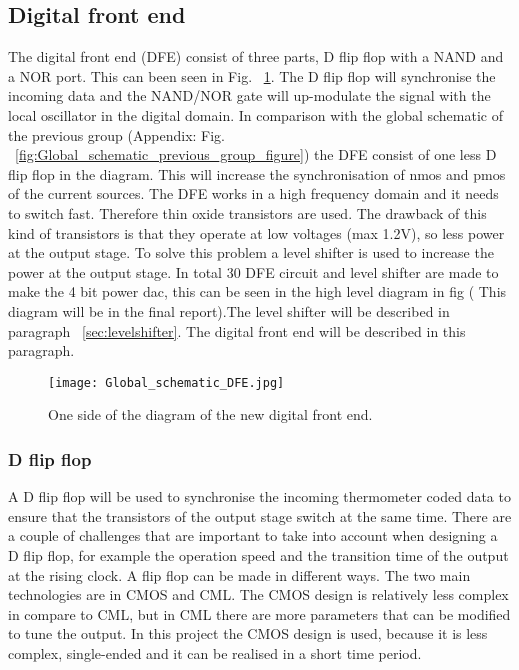 \subsection{Digital front end}\label{sec:frontend}
The digital front end (DFE) consist of three parts, D flip flop with a NAND and a NOR port. This can been seen in Fig. ~\ref{fig:Global_schematic_DFE_figure}. The D flip flop will synchronise the incoming data and the NAND/NOR gate will up-modulate the signal with the local oscillator in the digital domain. In comparison with the global schematic of the previous group (Appendix: Fig. ~\ref{fig:Global_schematic_previous_group_figure}) the DFE consist of one less D flip flop in the diagram. This will increase the synchronisation of nmos and pmos of the current sources. The DFE works in a high frequency domain and it needs to switch fast. Therefore thin oxide transistors are used. The drawback of this kind of transistors is that they operate at low voltages (max 1.2V), so less power at the output stage. To solve this problem a level shifter is used to increase the power at the output stage. In total 30 DFE circuit and level shifter are made to make the 4 bit power dac, this can be seen in the high level diagram in fig ( This diagram will be in the final report).The level shifter will be described in paragraph ~\ref{sec:levelshifter}. The digital front end will be described in this paragraph.

\begin{figure}[h]
\texttt{[image: Global\_schematic\_DFE.jpg]}
\caption{One side of the diagram of the new digital front end.}
\label{fig:Global_schematic_DFE_figure}
\end{figure}

\subsubsection{D flip flop}\label{sec:frontend}
A D flip flop will be used to synchronise the incoming thermometer coded data to ensure that the transistors of the output stage switch at the same time. There are a couple of challenges that are important to take into account when designing a D flip flop, for example the operation speed and the transition time of the output at the rising clock.
A flip flop can be made in different ways. The two main technologies are in CMOS and CML. The CMOS design is relatively less complex in compare to CML, but in CML there are more parameters that can be modified to tune the output. In this project the CMOS design is used, because it is less complex, single-ended and it can be realised in a short time period. 

